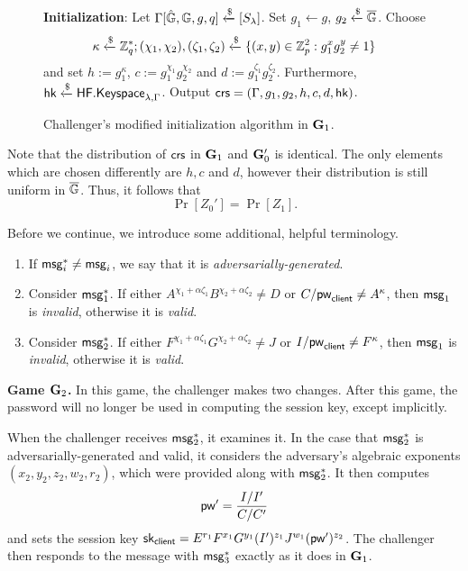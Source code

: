 \begin{figure}[h]
	\begin{framed}\small
		\textbf{Initialization}: Let $\Gamma[\hat{\mathbb{G}},\mathbb{G},g,q]\xleftarrow{\$}[S_\lambda]$. Set $g_1\gets g$, $g_2\xleftarrow{\$}\overline{\mathbb{G}}$. Choose $$\kappa\xleftarrow{\$}\mathbb{Z}_q^{*}; (\chi_1,\chi_2),(\zeta_1,\zeta_2)\xleftarrow{\$}\{(x,y)\in\mathbb{Z}_p^2:g_1^xg_2^y\neq 1\}$$ and set $h:=g_1^\kappa$, $c:=g_1^{\chi_1}g_2^{\chi_2}$ and $d:=g_1^{\zeta_1}g_2^{\zeta_2}$. Furthermore, $\mathsf{hk}\xleftarrow{\$}\mathsf{HF.Keyspace}_{\lambda,\Gamma}$. Output $\mathsf{crs} = (\Gamma,g_1, g_2,h,c,d,\mathsf{hk})$.
	\end{framed}
	\caption{Challenger's modified initialization algorithm in $\mathbf{G}_1$.}
	\label{fig:initialization-game-1}
\end{figure}

Note that the distribution of $\mathsf{crs}$ in $\mathbf{G}_1$ and $\mathbf{G}_0'$ is identical. The only elements which are chosen differently are $h, c$ and $d$, however their distribution is still uniform in $\overline{\mathbb{G}}$. Thus, it follows that $$\Pr[Z_0'] = \Pr[Z_1].$$

Before we continue, we introduce some additional, helpful terminology. 

\begin{enumerate}
	\item If $\mathsf{msg}_{i}^{*}\neq\mathsf{msg}_{i}$, we say that it is \textit{adversarially-generated}.
	\item Consider $\mathsf{msg}_{1}^{*}$. If either $A^{\chi_1+\alpha\zeta_1}B^{\chi_2+\alpha\zeta_2}\neq D$ or $C/\mathsf{pw}_{\mathsf{client}}\neq A^\kappa$, then $\mathsf{msg}_{1}$ is \textit{invalid}, otherwise it is \textit{valid}.
	\item Consider $\mathsf{msg}_{2}^{*}$. If either $F^{\chi_1+\alpha\zeta_1}G^{\chi_2+\alpha\zeta_2}\neq J$ or $I/\mathsf{pw}_{\mathsf{client}}\neq F^\kappa$, then $\mathsf{msg}_{1}$ is \textit{invalid}, otherwise it is \textit{valid}.
\end{enumerate}

\textbf{Game $\mathbf{G}_2$.} In this game, the challenger makes two changes. After this game, the password will no longer be used in computing the session key, except implicitly.

When the challenger receives $\mathsf{msg}_{2}^{*}$, it examines it. In the case that $\mathsf{msg}_{2}^{*}$ is adversarially-generated and valid, it considers the adversary's algebraic exponents $(x_2,y_2,z_2,w_2,r_2)$, which were provided along with $\mathsf{msg}_{2}^{*}$. It then computes $$\mathsf{pw}'=\frac{I/I'}{C/C'}$$ and sets the session key $\mathsf{sk}_{\mathsf{client}} = E^{r_1}F^{x_1}G^{y_1}(I')^{z_1}J^{w_1}(\mathsf{pw}')^{z_2}$. The challenger then responds to the message with $\mathsf{msg}_{3}^{*}$ exactly as it does in $\mathbf{G}_1$. 

